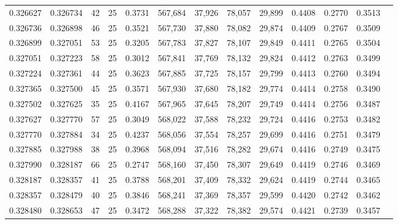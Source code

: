\begin{tabular}{rrrrrrrrrrrrr}
0.326627 & 0.326734 &    42 &  25 &                                     0.3731 & 567,684 &  37,926 &  78,057 &  29,899 & 0.4408 & 0.2770 & 0.3513 \\
0.326736 & 0.326898 &    46 &  25 &                                     0.3521 & 567,730 &  37,880 &  78,082 &  29,874 & 0.4409 & 0.2767 & 0.3509 \\
0.326899 & 0.327051 &    53 &  25 &                                     0.3205 & 567,783 &  37,827 &  78,107 &  29,849 & 0.4411 & 0.2765 & 0.3504 \\
0.327051 & 0.327223 &    58 &  25 &                                     0.3012 & 567,841 &  37,769 &  78,132 &  29,824 & 0.4412 & 0.2763 & 0.3499 \\
0.327224 & 0.327361 &    44 &  25 &                                     0.3623 & 567,885 &  37,725 &  78,157 &  29,799 & 0.4413 & 0.2760 & 0.3494 \\
0.327365 & 0.327500 &    45 &  25 &                                     0.3571 & 567,930 &  37,680 &  78,182 &  29,774 & 0.4414 & 0.2758 & 0.3490 \\
0.327502 & 0.327625 &    35 &  25 &                                     0.4167 & 567,965 &  37,645 &  78,207 &  29,749 & 0.4414 & 0.2756 & 0.3487 \\
0.327627 & 0.327770 &    57 &  25 &                                     0.3049 & 568,022 &  37,588 &  78,232 &  29,724 & 0.4416 & 0.2753 & 0.3482 \\
0.327770 & 0.327884 &    34 &  25 &                                     0.4237 & 568,056 &  37,554 &  78,257 &  29,699 & 0.4416 & 0.2751 & 0.3479 \\
0.327885 & 0.327988 &    38 &  25 &                                     0.3968 & 568,094 &  37,516 &  78,282 &  29,674 & 0.4416 & 0.2749 & 0.3475 \\
0.327990 & 0.328187 &    66 &  25 &                                     0.2747 & 568,160 &  37,450 &  78,307 &  29,649 & 0.4419 & 0.2746 & 0.3469 \\
0.328187 & 0.328357 &    41 &  25 &                                     0.3788 & 568,201 &  37,409 &  78,332 &  29,624 & 0.4419 & 0.2744 & 0.3465 \\
0.328357 & 0.328479 &    40 &  25 &                                     0.3846 & 568,241 &  37,369 &  78,357 &  29,599 & 0.4420 & 0.2742 & 0.3462 \\
0.328480 & 0.328653 &    47 &  25 &                                     0.3472 & 568,288 &  37,322 &  78,382 &  29,574 & 0.4421 & 0.2739 & 0.3457 \\

\end{tabular}
